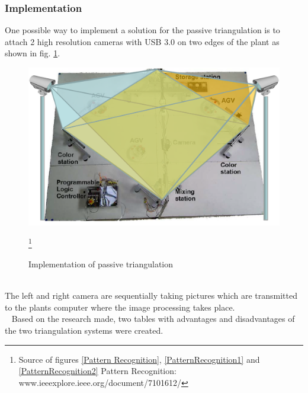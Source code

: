 \subsubsection*{Implementation} 
One possible way to implement a solution for the passive triangulation is to attach 2 high resolution cameras with USB 3.0 on two edges of the plant as shown in fig. \ref{ativeTriangulationimplementation}.\\
\begin{figure}[!htbp]
\centering
\includegraphics[width = 16cm]{Pictures/triangulationimplementatio}
\caption{Implementation of passive triangulation}
\label{ativeTriangulationimplementation}
\footnote{Source of figures \ref{Pattern Recognition}, \ref{PatternRecognition1} and \ref{PatternRecognition2}  Pattern Recognition: www.ieeexplore.ieee.org/document/7101612/} 
\end{figure}\\%
The left and right camera are sequentially taking pictures which are transmitted to the plants computer where the image processing takes place.\\ 
\ \newpage
Based on the research made, two tables with advantages and disadvantages of the two triangulation systems were created.
